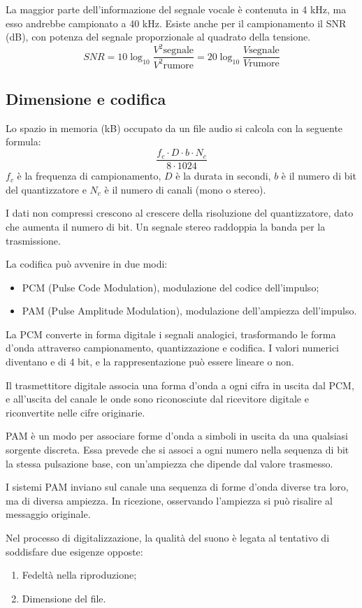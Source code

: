 La maggior parte dell'informazione del segnale vocale è contenuta in 4 kHz, ma esso andrebbe campionato a 40 kHz. Esiste anche per il campionamento il SNR (dB), con potenza del segnale proporzionale al quadrato della tensione.
$$SNR = 10\log_{10} \frac{V^2\text{segnale}}{V^2\text{rumore}} = 20\log_{10} \frac{V\text{segnale}}{V\text{rumore}}$$

\subsection{Dimensione e codifica}
Lo spazio in memoria (kB) occupato da un file audio si calcola con la seguente formula:
$$\frac{f_c \cdot D \cdot b \cdot N_c}{8 \cdot 1024}$$
$f_c$ è la frequenza di campionamento, $D$ è la durata in secondi, $b$ è il numero di bit del quantizzatore e $N_c$ è il numero di canali (mono o stereo).

I dati non compressi crescono al crescere della risoluzione del quantizzatore, dato che aumenta il numero di bit. Un segnale stereo raddoppia la banda per la trasmissione. 

La codifica può avvenire in due modi:
\begin{itemize}
	\item PCM (Pulse Code Modulation), modulazione del codice dell'impulso;
	\item PAM (Pulse Amplitude Modulation), modulazione dell'ampiezza dell'impulso.
\end{itemize}

La PCM converte in forma digitale i segnali analogici, trasformando le forma d'onda attraverso campionamento, quantizzazione e codifica. I valori numerici diventano e di 4 bit, e la rappresentazione può essere lineare o non.

Il trasmettitore digitale associa una forma d'onda a ogni cifra in uscita dal PCM, e all'uscita del canale le onde sono riconosciute dal ricevitore digitale e riconvertite nelle cifre originarie.

PAM è un modo per associare forme d'onda a simboli in uscita da una qualsiasi sorgente discreta. Essa prevede che si associ a ogni numero nella sequenza di bit la stessa pulsazione base, con un'ampiezza che dipende dal valore trasmesso.

I sistemi PAM inviano sul canale una sequenza di forme d'onda diverse tra loro, ma di diversa ampiezza. In ricezione, osservando l'ampiezza si può risalire al messaggio originale.

Nel processo di digitalizzazione, la qualità del suono è legata al tentativo di soddisfare due esigenze opposte:
\begin{enumerate}
	\item Fedeltà nella riproduzione;
	\item Dimensione del file.
\end{enumerate}

